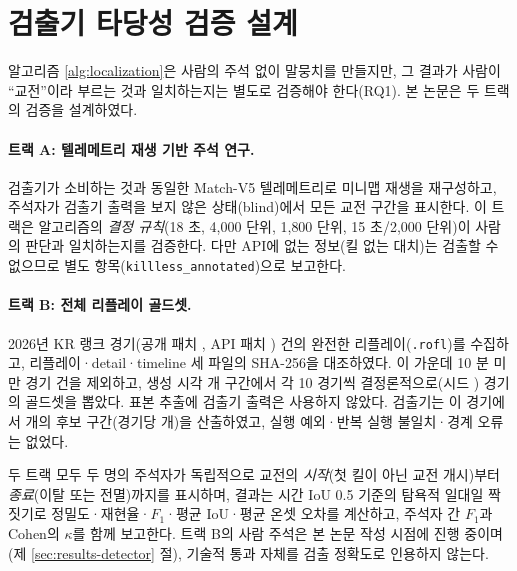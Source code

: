 
\section{검출기 타당성 검증 설계}
\label{sec:loc-validation}

알고리즘 \ref{alg:localization}은 사람의 주석 없이 말뭉치를 만들지만, 그 결과가 사람이 ``교전''이라 부르는 것과 일치하는지는 별도로 검증해야 한다(RQ1). 본 논문은 두 트랙의 검증을 설계하였다.

\paragraph{트랙 A: 텔레메트리 재생 기반 주석 연구.} 검출기가 소비하는 것과 동일한 Match-V5 텔레메트리로 미니맵 재생을 재구성하고, 주석자가 검출기 출력을 보지 않은 상태(blind)에서 모든 교전 구간을 표시한다. 이 트랙은 알고리즘의 \emph{결정 규칙}(18 초, 4{,}000 단위, 1{,}800 단위, 15 초/2{,}000 단위)이 사람의 판단과 일치하는지를 검증한다. 다만 API에 없는 정보(킬 없는 대치)는 검출할 수 없으므로 별도 항목(\texttt{killless\_annotated})으로 보고한다.

\paragraph{트랙 B: 전체 리플레이 골드셋.} 2026년 KR 랭크 경기(공개 패치 \goldPatchPublic{}, API 패치 \goldPatchApi{}) \numReplays{} 건의 완전한 리플레이(\texttt{.rofl})를 수집하고, 리플레이·detail·timeline 세 파일의 SHA-256을 대조하였다. 이 가운데 10 분 미만 경기 \numReplaysExcluded{} 건을 제외하고, 생성 시각 \numGoldBins{} 개 구간에서 각 10 경기씩 결정론적으로(시드 \goldSeed{}) \numGoldMatches{} 경기의 골드셋을 뽑았다. 표본 추출에 검출기 출력은 사용하지 않았다. 검출기는 이 \numGoldMatches{} 경기에서 \numGoldCandidates{} 개의 후보 구간(경기당 \goldCandidatesPerMatch{} 개)을 산출하였고, 실행 예외·반복 실행 불일치·경계 오류는 없었다.

두 트랙 모두 두 명의 주석자가 독립적으로 교전의 \emph{시작}(첫 킬이 아닌 교전 개시)부터 \emph{종료}(이탈 또는 전멸)까지를 표시하며, 결과는 시간 IoU 0.5 기준의 탐욕적 일대일 짝짓기로 정밀도·재현율·$F_1$·평균 IoU·평균 온셋 오차를 계산하고, 주석자 간 $F_1$과 Cohen의 $\kappa$를 함께 보고한다. 트랙 B의 사람 주석은 본 논문 작성 시점에 진행 중이며(제 \ref{sec:results-detector} 절), 기술적 통과 자체를 검출 정확도로 인용하지 않는다.
